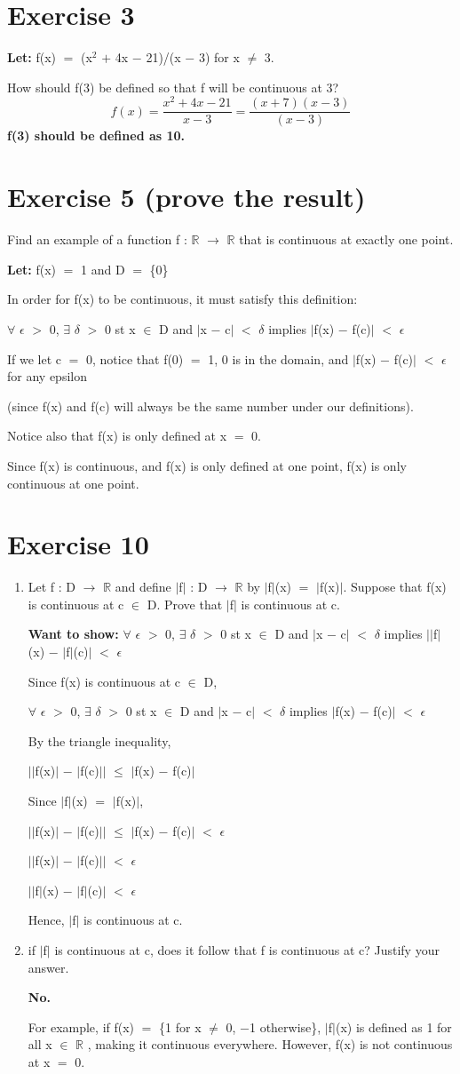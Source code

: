 \documentclass{article}
\newcommand{\mt}[1]{\ensuremath{#1}}
\newcommand\bsc[2][\DefaultOpt]{%
  \def\DefaultOpt{#2}%
  \section[#1]{#2}%
}
\newcommand{\balist}{\begin{enumerate}[label=\alph*.]}
\newcommand{\elist}{\end{enumerate}}
\newcommand{\lt}[1]{\textbf{Let: } #1}
\newcommand{\wts}[1]{\textbf{Want to show: } #1}
\newcommand{\br}{\mt{\mathbb{R}} }       %
\newcommand{\ep}{\mt{\epsilon} }         %
\newcommand{\fa}{\mt{\forall} }          %
\newcommand{\dta}{\mt{\delta} }
\newcommand{\mem}{\mt{\in} }
\newcommand{\exs}{\mt{\exists} }
\newcommand{\lra}{ \mt{\longrightarrow} } %
\newcommand{\av}[1]{\mt{|}#1\mt{|}}  %
\newcommand{\prn}[1]{(#1)}
\newcommand{\bk}[1]{\{#1\}}
\newcommand{\ps}{\mt{+} }
\newcommand{\ms}{\mt{-} }
\newcommand{\ls}{\mt{<} }
\newcommand{\gr}{\mt{>} }
\newcommand{\lse}{\mt{\leq} }
\newcommand{\eql}{\mt{=} }
\newcommand{\uf}[2]{#1\mt{^{#2}}}
\newcommand{\eqn}[1]{\[#1\]}
\begin{document}
\bsc{Exercise 3}{

\lt{f(x) \eql \prn{\uf{x}{2} \ps 4x \ms 21}/\prn{x \ms 3} for x $\neq$ 3.}

How should f(3) be defined so that f will be continuous at 3?
\eqn{f(x) = \frac{x^2 + 4x - 21}{x - 3} = \frac{(x + 7)(x - 3)}{(x - 3)}}
\textbf{f(3) should be defined as 10.}

}

\bsc{Exercise 5 (prove the result)}{

Find an example of a function f : \br \lra \br that is continuous at exactly one point.

\lt{f(x) \eql 1 and D \eql \bk{0}}

In order for f(x) to be continuous, it must satisfy this definition:

\fa \ep \gr 0, \exs \dta \gr 0 st x \mem D and \av{x \ms c} \ls \dta implies \av{f(x) \ms f(c)} \ls \ep

If we let c \eql 0, notice that f(0) \eql 1, 0 is in the domain, and \av{f(x) \ms f(c)} \ls \ep for any epsilon

(since f(x) and f(c) will always be the same number under our definitions).

Notice also that f(x) is only defined at x \eql 0.

Since f(x) is continuous, and f(x) is only defined at one point, f(x) is only continuous at one point.
}

\bsc{Exercise 10}{

\balist
\item Let f : D \lra \br and define \av{f} : D \lra \br by \av{f}(x) \eql \av{f(x)}. Suppose that f(x) is continuous at c \mem D. Prove that \av{f} is continuous at c.
	
	\wts{\fa \ep \gr 0, \exs \dta \gr 0 st x \mem D and \av{x \ms c} \ls \dta implies \av{\av	{f}(x) \ms \av{f}(c)} \ls \ep}
	
	Since f(x) is continuous at c \mem D,
	
	\fa \ep \gr 0, \exs \dta \gr 0 st x \mem D and \av{x \ms c} \ls \dta implies \av{f(x) \ms f(c)} \ls \ep
	
	By the triangle inequality,
	
	\av{\av{f(x)} \ms \av{f(c)}} \lse \av{f(x) \ms f(c)}
	
	Since \av{f}(x) \eql \av{f(x)},
	
	\av{\av{f(x)} \ms \av{f(c)}} \lse \av{f(x) \ms f(c)} \ls \ep
	
	\av{\av{f(x)} \ms \av{f(c)}} \ls \ep
	
	\av{\av{f}(x) \ms \av{f}(c)} \ls \ep
	
	Hence, \av{f} is continuous at c.
	
	
\item if \av{f} is continuous at c, does it follow that f is continuous at c? Justify your answer.
	
	\textbf{No.}
	
	For example, if f(x) \eql \bk{1 for x $\neq$ 0, $-$1 otherwise}, \av{f}(x) is defined as 1 for all x \mem \br, making it continuous everywhere. However, f(x) is not continuous at x \eql 0.
\elist

}
\end{document}
